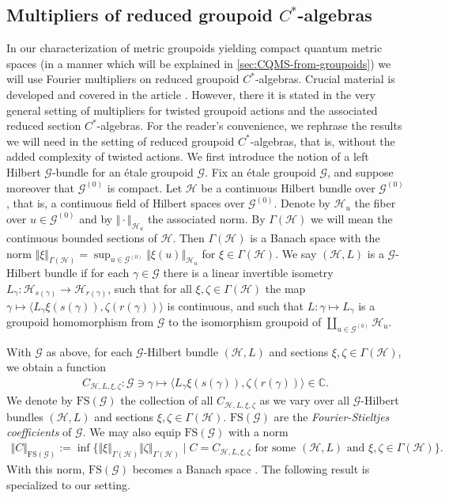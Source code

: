 \documentclass[11pt,a4paper,oneside,final,reqno]{amsart}
\theoremstyle{definition}
\newcommand{\G}{\mathcal{G}}
\newcommand{\Go}{\mathcal{G}^{(0)}}
\newcommand{\curlyH}{\mathcal{H}}
\newcommand{\FS}{\mathrm{FS}}
\newcommand{\C}{\mathbb{C}}
\numberwithin{equation}{section}
\begin{document}
	\subsection{Multipliers of reduced groupoid $C^*$-algebras} \label{sec:prelims-multipliers}
	In our characterization of metric groupoids yielding compact quantum metric spaces (in a manner which will be explained in \cref{sec:CQMS-from-groupoids}) we will use Fourier multipliers on reduced groupoid $C^*$-algebras. Crucial material is developed and covered in the article \cite{BussKwasniewskiMcKeeSkalski2024}. However, there it is stated in the very general setting of multipliers for twisted groupoid actions and the associated reduced section $C^*$-algebras. For the reader's convenience,   
	we rephrase the results we will need in the setting of reduced groupoid $C^*$-algebras, that is, without the added complexity of twisted actions. 
	We first introduce the notion of a left Hilbert $\G$-bundle for an \'etale groupoid $\G$.  
	Fix an \'etale groupoid $\G$, and suppose moreover that $\Go$ is compact. Let $\curlyH$ be a continuous Hilbert bundle over $\Go$, that is, a continuous field of Hilbert spaces over $\Go$. Denote by $\curlyH_u$ the fiber over $u \in \Go$ and by $\Vert \cdot \Vert_{\curlyH_u}$ the associated norm. 
	By $\Gamma (\curlyH)$ we will mean the continuous bounded sections of $\curlyH$. Then $\Gamma(\curlyH)$ is a Banach space with the norm 
	$\Vert \xi \Vert_{\Gamma(\curlyH)} = \sup_{u \in \Go} \Vert \xi(u) \Vert_{\curlyH_u}$ for $\xi \in \Gamma(\curlyH)$. 
	We say $(\curlyH, L)$ is a $\G$-Hilbert bundle if for each $\gamma \in \G$ there is a linear invertible isometry $L_\gamma\colon \curlyH_{s(\gamma )} \to \curlyH_{r(\gamma)}$, such that for all $\xi, \zeta \in \Gamma(\curlyH)$ the map $\gamma \mapsto \langle L_\gamma \xi(s(\gamma)), \zeta(r(\gamma))\rangle$ is continuous, and such that $L \colon \gamma \mapsto L_\gamma$ is a groupoid homomorphism from $\G $ to the isomorphism groupoid of $\coprod_{u \in \Go} \curlyH_u$.
	
	
	With  
	$\G$ as above, for each $\G$-Hilbert bundle $(\curlyH, L)$ and sections $\xi, \zeta \in \Gamma(\curlyH)$, we obtain a function
	\begin{align*}
		C_{\curlyH, L, \xi, \zeta} \colon \G \ni \gamma \mapsto \langle L_\gamma \xi(s(\gamma)), \zeta(r(\gamma))\rangle \in \C .
	\end{align*}
	We denote by $\FS(\G)$ the collection of all $C_{\curlyH, L, \xi, \zeta}$ as we vary over all $\G$-Hilbert bundles $(\curlyH, L)$ and sections $\xi, \zeta \in \Gamma(\curlyH)$. $\FS(\G)$ are the \emph{Fourier-Stieltjes coefficients} of $\G$. We may also equip $\FS(\G)$ with a norm
	\begin{align*}
		\Vert C \Vert_{\FS(\G)} := \inf \{ \Vert \xi \Vert_{\Gamma(\curlyH)} \Vert \zeta \Vert_{\Gamma(\curlyH)} \mid C = C_{\curlyH, L, \xi, \zeta} \text{ for some $(\curlyH, L)$ and $\xi,\zeta \in \Gamma(\curlyH)$} \}.
	\end{align*}
	With this norm, $\FS(\G)$ becomes a Banach space \cite[Proposition 7.10]{BussKwasniewskiMcKeeSkalski2024}. 
	The following result is \cite[Theorem 7.13]{BussKwasniewskiMcKeeSkalski2024} specialized to our setting.
	
\end{document}
